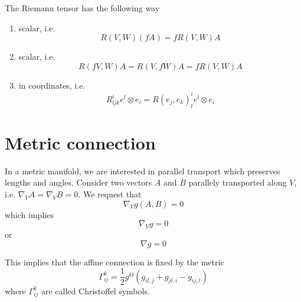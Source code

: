     The Riemann tensor has the following way 
    \begin{enumerate}
        \item scalar, i.e. 
            \begin{equation*}
                R(V,W) (fA) = f R(V, W) A
            \end{equation*}
        \item scalar, i.e. 
            \begin{equation*}
                R(fV,W) A = R(V, fW) A = f R(V, W) A
            \end{equation*}
        \item in coordinates, i.e. 
            \begin{equation*}
                R^i_{ljk} e^l \otimes e_i = R(e_j, e_k)^i_l e^l \otimes e_i
            \end{equation*}
    \end{enumerate}

\section{Metric connection}

    In a metric manifold, we are interested in parallel transport which preserves lengths and angles. Consider two vectors $A$ and $B$ parallely transported along $V$, i.e. $\nabla_V A = \nabla_V B = 0$. We request that 
    \begin{equation*}
        \nabla_V g(A,B) = 0
    \end{equation*}
    which implies
    \begin{equation*}
        \nabla_V g = 0
    \end{equation*}
    or 
    \begin{equation*}
        \nabla g = 0
    \end{equation*}

    This implies that the affine connection is fixed by the metric 
    \begin{equation}\label{chr}
        \Gamma^k_{ij} = \frac{1}{2} g^{kl} (g_{il,j} + g_{jl,i} - g_{ij,l})
    \end{equation}
    where $\Gamma^k_{ij}$ are called Christoffel symbols.

